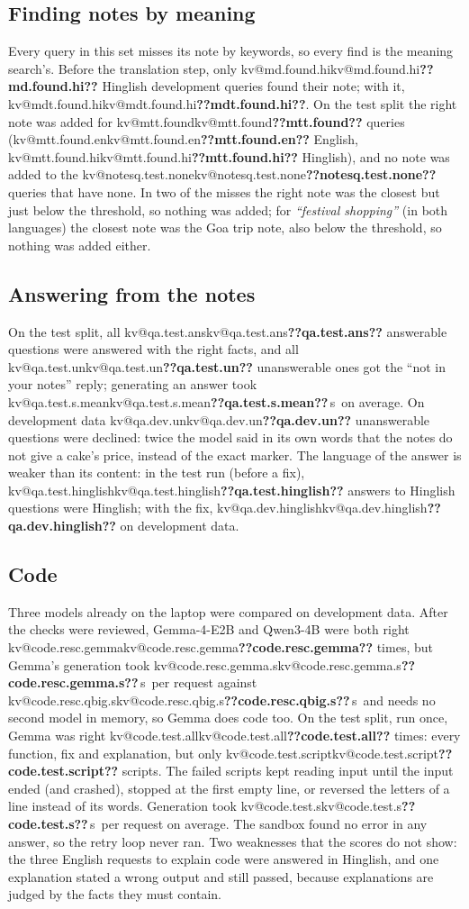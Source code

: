 \documentclass[11pt,a4paper]{article}
\makeatletter
\DeclareRobustCommand{\kv}[1]{\ifcsname kv@#1\endcsname\csname kv@#1\endcsname\else\textbf{??#1??}\fi}
\newcommand{\s}{\,s}
\newcommand{\req}[1]{\textit{``#1''}}
\makeatother
\begin{document}
\subsection{Finding notes by meaning}
Every query in this set misses its note by keywords, so every find is the meaning search's. Before the translation step,
only \kv{md.found.hi} Hinglish development queries found their note; with it, \kv{mdt.found.hi}. On the test split the
right note was added for \kv{mtt.found} queries (\kv{mtt.found.en} English, \kv{mtt.found.hi} Hinglish), and no note was
added to the \kv{notesq.test.none} queries that have none. In two of the misses the right note was the closest but just
below the threshold, so nothing was added; for \req{festival shopping} (in both languages) the closest note was the Goa trip
note, also below the threshold, so nothing was added either.

\subsection{Answering from the notes}
On the test split, all \kv{qa.test.ans} answerable questions were answered with the right facts, and all
\kv{qa.test.un} unanswerable ones got the ``not in your notes'' reply; generating an answer took \kv{qa.test.s.mean}\s\ on average.
On development data \kv{qa.dev.un} unanswerable questions were declined: twice the model said in its own words that the
notes do not give a cake's price, instead of the exact marker. The language of the answer is weaker than its content:
in the test run (before a fix), \kv{qa.test.hinglish} answers to Hinglish questions were Hinglish; with the fix,
\kv{qa.dev.hinglish} on development data.

\subsection{Code}
Three models already on the laptop were compared on development data. After the checks were reviewed, Gemma-4-E2B and
Qwen3-4B were both right \kv{code.resc.gemma} times, but Gemma's generation took \kv{code.resc.gemma.s}\s\ per request against
\kv{code.resc.qbig.s}\s\ and needs no second model in memory, so Gemma does code too. On the test split, run once, Gemma
was right \kv{code.test.all} times: every function, fix and explanation, but only \kv{code.test.script} scripts. The failed
scripts kept reading input until the input ended (and crashed), stopped at the first empty line, or reversed the letters
of a line instead of its words. Generation took \kv{code.test.s}\s\ per request on average. The sandbox found no error in any answer, so
the retry loop never ran. Two weaknesses that the scores do not show: the three English requests to explain code were
answered in Hinglish, and one explanation stated a wrong output and still passed, because explanations are judged by
the facts they must contain.
\end{document}

